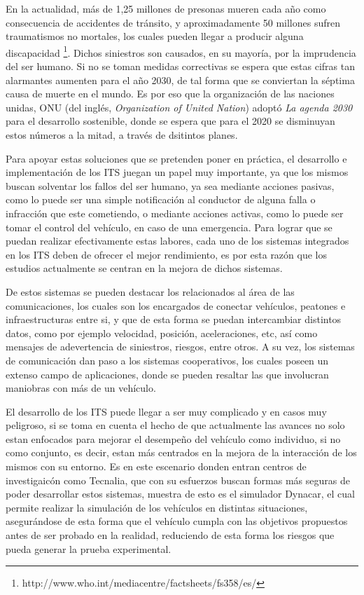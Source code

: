 En la actualidad, más de 1,25 millones de presonas mueren cada año como consecuencia de accidentes de tránsito, y aproximadamente 50 millones sufren traumatismos no mortales, los cuales pueden llegar a producir alguna discapacidad \footnote{http://www.who.int/mediacentre/factsheets/fs358/es/}. Dichos siniestros son causados, en su mayoría, por la imprudencia del ser humano. Si no se toman medidas correctivas se espera que estas cifras tan alarmantes aumenten para el año 2030, de tal forma que se conviertan la séptima causa de muerte en el mundo. Es por eso que la organización de las naciones unidas, ONU (del inglés, \textit{Organization of United Nation}) adoptó \textit{La agenda 2030} para el desarrollo sostenible, donde se espera que para el 2020 se disminuyan estos números a la mitad, a través de dsitintos planes.\\ 

\par Para apoyar estas soluciones que se pretenden poner en práctica, el desarrollo e implementación de los ITS juegan un papel muy importante, ya que los mismos buscan solventar los fallos del ser humano, ya sea mediante acciones pasivas, como lo puede ser una simple notificación al conductor de alguna falla o infracción que este cometiendo, o mediante acciones activas, como lo puede ser tomar el control del vehículo, en caso de una emergencia. Para lograr que se puedan realizar efectivamente estas labores, cada uno de los sistemas integrados en los ITS deben de ofrecer el mejor rendimiento, es por esta razón que los estudios actualmente se centran en la mejora de dichos sistemas.\\  

\par De estos sistemas se pueden destacar los relacionados al área de las comunicaciones, los cuales son los encargados de conectar vehículos, peatones e infraestructuras entre si, y que de esta forma se puedan intercambiar distintos datos, como por ejemplo velocidad, posición, aceleraciones, etc, así como mensajes de adevertencia de siniestros, riesgos, entre otros. A su vez, los sistemas de comunicación dan paso a los sistemas cooperativos, los cuales poseen un extenso campo de aplicaciones, donde se pueden resaltar las que involucran maniobras con más de un vehículo.\\ 

\par El desarrollo de los ITS puede llegar a ser muy complicado y en casos muy peligroso, si se toma en cuenta el hecho de que actualmente las avances no solo estan enfocados para mejorar el desempeño del vehículo como individuo, si no como conjunto, es decir, estan más centrados en la mejora de la interacción de los mismos con su entorno. Es en este escenario donden entran centros de investigaicón como Tecnalia, que con su esfuerzos buscan formas más seguras de poder desarrollar estos sistemas, muestra de esto es el simulador Dynacar, el cual permite realizar la simulación de los vehículos en distintas situaciones, asegurándose de esta forma que el vehículo cumpla con las objetivos propuestos antes de ser probado en la realidad, reduciendo de esta forma los riesgos que pueda generar la prueba experimental.\\

